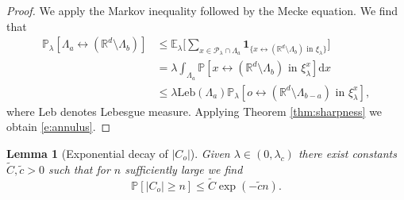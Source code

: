 \documentclass[a4paper,12pt]{scrartcl}
\newcommand{\E}{\mathbb{E}}
\renewcommand{\P}{\mathbb{P}}
\renewcommand{\d}{\mathrm{d}}
\newtheorem{lemma}[theorem]{Lemma}
\theoremstyle{definition}
\theoremstyle{remark}
\begin{document}
  \begin{proof}
    We apply the Markov inequality followed by the Mecke equation. We find that
    \begin{align*}
      \P_{\lambda}[
        \Lambda_a\leftrightarrow (\mathbb R^d \setminus \Lambda_{b})
      ]
      & \leq
      \E_{\lambda} \Big[
        \sum_{x\in\mathcal P_{\lambda} \cap \Lambda_a}
        \mathbf{1}_{\{ x\leftrightarrow (\mathbb R^d \setminus \Lambda_{b})
        \text{ in } \xi_{\lambda} \}}
      \Big]                                                                                    \\
      & = \lambda \int_{\Lambda_a}
      \P[x\leftrightarrow (\mathbb R^d \setminus \Lambda_{b}) \text{ in } \xi_\lambda^x]
      \d x                                                                                 \\
      & \leq \lambda \text{Leb}(\Lambda_a) \P_{\lambda}[o\leftrightarrow
      (\mathbb R^d \setminus \Lambda_{b-a}) \text{ in } \xi_\lambda^x ],
    \end{align*}
    where Leb denotes Lebesgue measure.
    Applying
    Theorem \ref{thm:sharpness} we obtain \eqref{e:annulus}.
  \end{proof}

  \begin{lemma}[Exponential decay of $|C_o|$] \label{lem:vol_decay}
    Given $\lambda\in(0,\lambda_c)$ there exist constants $\tilde C,\tilde c>0$ such that for $n$ sufficiently large we find
    \begin{equation}
      \P[|C_o|\geq n]\leq \tilde C\exp(-\tilde c n).
      \label{e:expCo}
    \end{equation}
  \end{lemma}
\end{document}
